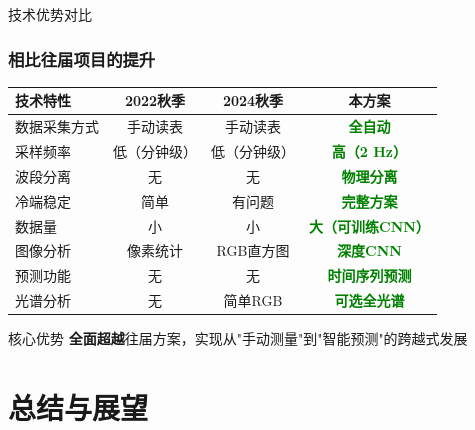 \documentclass[aspectratio=169,11pt]{ctexbeamer}
\begin{document}
\begin{frame}{技术优势对比}
\frametitle{相比往届项目的提升}
\begin{table}
\centering
\small
\begin{tabular}{lccc}
\toprule
\textbf{技术特性} & \textbf{2022秋季} & \textbf{2024秋季} & \textbf{本方案} \\
\midrule
数据采集方式 & 手动读表 & 手动读表 & \textcolor{green}{\textbf{全自动}} \\
采样频率 & 低（分钟级） & 低（分钟级） & \textcolor{green}{\textbf{高（2 Hz）}} \\
波段分离 & 无 & 无 & \textcolor{green}{\textbf{物理分离}} \\
冷端稳定 & 简单 & 有问题 & \textcolor{green}{\textbf{完整方案}} \\
数据量 & 小 & 小 & \textcolor{green}{\textbf{大（可训练CNN）}} \\
图像分析 & 像素统计 & RGB直方图 & \textcolor{green}{\textbf{深度CNN}} \\
预测功能 & 无 & 无 & \textcolor{green}{\textbf{时间序列预测}} \\
光谱分析 & 无 & 简单RGB & \textcolor{green}{\textbf{可选全光谱}} \\
\bottomrule
\end{tabular}
\end{table}

\begin{alertblock}{核心优势}
\textbf{全面超越}往届方案，实现从"手动测量"到"智能预测"的跨越式发展
\end{alertblock}
\end{frame}

\section{总结与展望}
\end{document}
